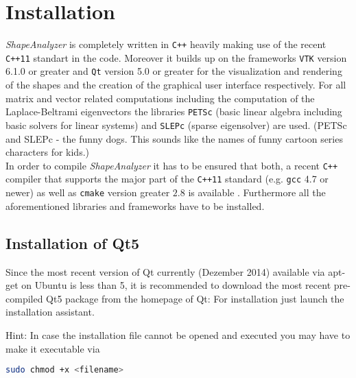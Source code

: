 
\chapter{Installation}

\emph{ShapeAnalyzer} is completely written in \texttt{C++} heavily making use of the recent \texttt{C++11} standart in the code. Moreover it builds up on the frameworks \texttt{VTK} version 6.1.0 or greater and \texttt{Qt} version 5.0 or greater for the visualization and rendering of the shapes and the creation of the graphical user interface respectively. For all matrix and vector related computations including the computation of the Laplace-Beltrami eigenvectors the libraries \texttt{PETSc} (basic linear algebra including basic solvers for linear systems) and \texttt{SLEPc} (sparse eigensolver) are used. (PETSc and SLEPc - the funny dogs. This sounds like the names of funny cartoon series characters for kids.)\\
In order to compile \emph{ShapeAnalyzer} it has to be ensured that both, a recent \texttt{C++} compiler that supports the major part of the \texttt{C++11} standard (e.g. \texttt{gcc} 4.7 or newer) as well as \texttt{cmake} version greater $2.8$ is available . Furthermore all the aforementioned libraries and frameworks have to be installed.


\section{Installation of Qt5}
Since the most recent version of Qt currently (Dezember 2014) available via apt-get on Ubuntu is less than 5, it is recommended to download the most recent pre-compiled Qt5 package from the homepage of Qt: 
For installation just launch the installation assistant.

\begin{mdframed}
Hint: In case the installation file cannot be opened and executed you may have to make it executable via
\begin{lstlisting}[language=bash, numbers=none]
	sudo chmod +x <filename>
\end{lstlisting}
\end{mdframed}


